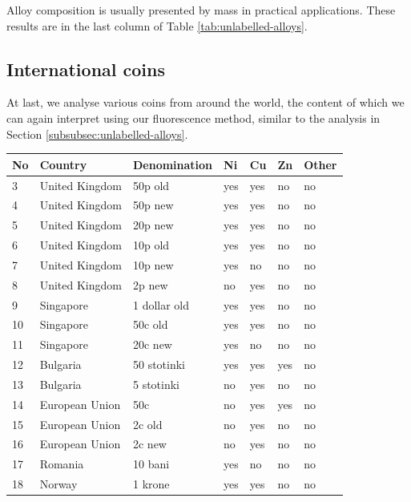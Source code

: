 \documentclass[11pt,a4paper,twoside,onecolumn]{article}
\begin{document}
Alloy composition is usually presented by mass in practical applications. These results are in the last column of Table \ref{tab:unlabelled-alloys}.

\subsection{International coins}
At last, we analyse various coins from around the world, the content of which we can again interpret using our fluorescence method, similar to the analysis in Section \ref{subsubsec:unlabelled-alloys}.

\begin{table}[!htbp]
    \centering
    \begin{tabular}{@{}lllllll@{}}
    \toprule
    No & Country        & Denomination   & Ni  & Cu  & Zn  & Other \\ \midrule
    3  & United Kingdom & 50p old        & yes & yes & no  & no    \\
    4  & United Kingdom & 50p new        & yes & yes & no  & no    \\
    5  & United Kingdom & 20p new        & yes & yes & no  & no    \\
    6  & United Kingdom & 10p old        & yes & yes & no  & no    \\
    7  & United Kingdom & 10p new        & yes & no  & no  & no    \\
    8  & United Kingdom & 2p new         & no  & yes & no  & no    \\
    9  & Singapore      & 1 dollar old   & yes & yes & no  & no    \\
    10 & Singapore      & 50c old        & yes & yes & no  & no    \\
    11 & Singapore      & 20c new        & yes & no  & no  & no    \\
    12 & Bulgaria       & 50 stotinki    & yes & yes & yes & no    \\
    13 & Bulgaria       & 5 stotinki     & no  & yes & no  & no    \\
    14 & European Union & 50c            & no  & yes & yes & no    \\
    15 & European Union & 2c old         & no  & yes & no  & no    \\
    16 & European Union & 2c new         & no  & yes & no  & no    \\
    17 & Romania        & 10 bani        & yes & no  & no  & no    \\
    18 & Norway         & 1 krone        & yes & yes & no  & no    \\

\end{tabular}
\end{table}
\end{document}
